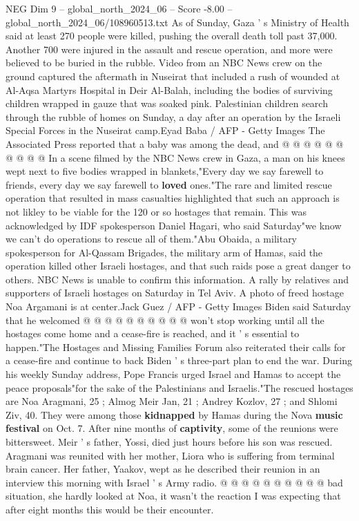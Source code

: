 \begin{textsample}{NEG Dim 9 – global\_north\_2024\_06 – Score -8.00 – global\_north\_2024\_06/108960513.txt}
As of Sunday, Gaza ' s Ministry of Health said at least 270 people were killed, pushing the overall death toll past 37,000.
Another 700 were injured in the assault and rescue operation, and more were believed to be buried in the rubble.
Video from an NBC News crew on the ground captured the aftermath in Nuseirat that included a rush of wounded at Al-Aqsa Martyrs Hospital in Deir Al-Balah, including the bodies of surviving children wrapped in gauze that was soaked pink.
Palestinian children search through the rubble of homes on Sunday, a day after an operation by the Israeli Special Forces in the Nuseirat camp.Eyad Baba / AFP - Getty Images The Associated Press reported that a baby was among the dead, and @ @ @ @ @ @ @ @ @ @ In a scene filmed by the NBC News crew in Gaza, a man on his knees wept next to five bodies wrapped in blankets,"Every day we say farewell to friends, every day we say farewell to \textbf{loved} ones."The rare and limited rescue operation that resulted in mass casualties highlighted that such an approach is not likley to be viable for the 120 or so hostages that remain.
This was acknowledged by IDF spokesperson Daniel Hagari, who said Saturday"we know we can't do operations to rescue all of them."Abu Obaida, a military spokesperson for Al-Qassam Brigades, the military arm of Hamas, said the operation killed other Israeli hostages, and that such raids pose a great danger to others.
NBC News is unable to confirm this information.
A rally by relatives and supporters of Israeli hostages on Saturday in Tel Aviv.
A photo of freed hostage Noa Argamani is at center.Jack Guez / AFP - Getty Images Biden said Saturday that he welcomed @ @ @ @ @ @ @ @ @ @ won't stop working until all the hostages come home and a cease-fire is reached, and it ' s essential to happen."The Hostages and Missing Families Forum also reiterated their calls for a cease-fire and continue to back Biden ' s three-part plan to end the war.
During his weekly Sunday address, Pope Francis urged Israel and Hamas to accept the peace proposals"for the sake of the Palestinians and Israelis."The rescued hostages are Noa Aragmani, 25 ; Almog Meir Jan, 21 ; Andrey Kozlov, 27 ; and Shlomi Ziv, 40.
They were among those \textbf{kidnapped} by Hamas during the Nova \textbf{music} \textbf{festival} on Oct. 7.
After nine months of \textbf{captivity}, some of the reunions were bittersweet.
Meir ' s father, Yossi, died just hours before his son was rescued.
Aragmani was reunited with her mother, Liora who is suffering from terminal brain cancer.
Her father, Yaakov, wept as he described their reunion in an interview this morning with Israel ' s Army radio. @ @ @ @ @ @ @ @ @ @ bad situation, she hardly looked at Noa, it wasn't the reaction I was expecting that after eight months this would be their encounter.

\end{textsample}

